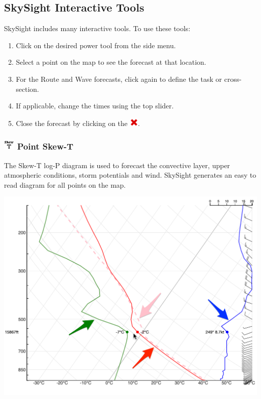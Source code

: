 \documentclass[9pt,a4paper,twocolumn]{article}
\begin{document}
\subsection*{SkySight Interactive Tools}
SkySight includes many interactive tools. To use these tools:
\begin{enumerate}
\item Click on the desired power tool from the side menu.
\item Select a point on the map to see the forecast at that location.
\item For the Route and Wave forecasts, click again to define the task or cross-section.
\item If applicable, change the times using the top slider.
\item Close the forecast by clicking on the \includegraphics[height=12pt]{images/icons/exit.png}.
\end{enumerate}
\subsubsection*{\includegraphics[height=15pt]{images/icons/skew-t.png} Point Skew-T}
The Skew-T log-P diagram is used to forecast the convective layer, upper atmospheric conditions, storm potentials and wind. SkySight generates an easy to read diagram for all points on the map.

\includegraphics[width=\linewidth]{images/skew-t.png}
\end{document}
